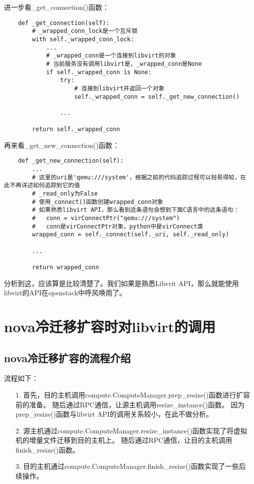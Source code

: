 \documentclass[a4paper,left=1.5cm,right=1.5cm,11pt]{article}
\begin{document}
	进一步看\_get\_connection()函数：
	\begin{lstlisting}
	def _get_connection(self):
		# _wrapped_conn_lock是一个互斥锁
        with self._wrapped_conn_lock:
			...
			# _wrapped_conn是一个连接到libvirt的对象
            # 当前服务没有调用libvirt是，_wrapped_conn是None
            if self._wrapped_conn is None:
                try:
                    # 连接到libvirt并返回一个对象
                    self._wrapped_conn = self._get_new_connection()
                
				...

        return self._wrapped_conn
	\end{lstlisting}

	再来看\_get\_new\_connection()函数：
	\begin{lstlisting}
	def _get_new_connection(self):
        ...
		# 这里的uri是'qemu:///system'，根据之前的代码追踪过程可以轻易得知，在此不再详述如何追踪到它的值
		# _read_only为False
		# 使用_connect()函数创建wrapped_conn对象
		# 如果熟悉libvirt API，那么看到这条语句会想到下面C语言中的这条语句：
		#	conn = virConnectPtr("qemu:///system")
		#	conn是virConnectPtr对象，python中是virConnect类
        wrapped_conn = self._connect(self._uri, self._read_only)

        ...

        return wrapped_conn
	\end{lstlisting}

	分析到这，应该算是比较清楚了。我们如果是熟悉Libvrit API，那么就能使用libvirt的API在openstack中呼风唤雨了。\par

\clearpage

\section{nova冷迁移扩容时对libvirt的调用}
\subsection{nova冷迁移扩容的流程介绍}
	流程如下：
	\begin{itemize}
		\item[1.] 首先，目的主机调用compute.ComputeManager.prep\_resize()函数进行扩容前的准备。
				  随后通过RPC通信，让源主机调用resize\_instance()函数。
				  因为prep\_resize()函数与libvirt API的调用关系较小，在此不做分析。
		\item[2.] 源主机通过compute.ComputeManager.resize\_instance()函数实现了将虚拟机的增量文件迁移到目的主机上。
			      随后通过RPC通信，让目的主机调用finish\_resize()函数。
		\item[3.] 目的主机通过compute.ComputeManager.finish\_resize()函数实现了一些后续操作。
	\end{itemize}
\end{document}
